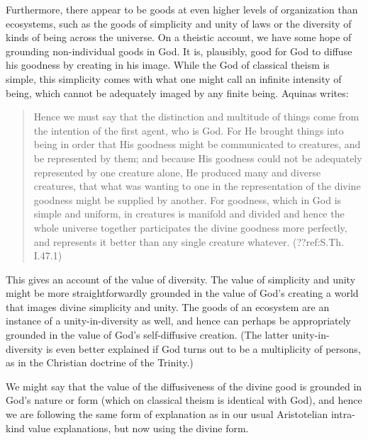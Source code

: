 Furthermore, there appear to be goods at even higher levels of organization than ecosystems, such as the goods
of simplicity and unity of 
laws or the diversity of kinds of being across the universe. On a theistic account, we have some hope of grounding
non-individual goods in God. It is, plausibly, good for God to diffuse his goodness
by creating in his image. While the God of classical theism is simple, this simplicity comes with what
one might call an infinite intensity of being, which cannot be adequately imaged by any finite being. Aquinas
writes:
\begin{quote}
Hence we must say that the distinction and multitude of things come from the intention of the first agent, who is God. For He brought things into being in order that His goodness might be communicated to creatures, and be represented by them; and because His goodness could not be adequately represented by one creature alone, He produced many and diverse creatures, that what was wanting to one in the representation of the divine goodness might be supplied by another. For goodness, which in God is simple and uniform, in creatures is manifold and divided and hence the whole universe together participates the divine goodness more perfectly, and represents it better than any single creature whatever. (??ref:S.Th. I.47.1)
\end{quote}
This gives an account of the value of diversity. The value of simplicity and unity might be more straightforwardly
grounded in the value of God's creating a world that images divine simplicity and unity. The goods of an ecosystem
are an instance of a unity-in-diversity as well, and hence can perhaps be appropriately grounded in the value of God's
self-diffusive creation. (The latter unity-in-diversity is even better explained if God turns out to be a multiplicity
of persons, as in the Christian doctrine of the Trinity.)

We might say that the value of the diffusiveness of the divine good is grounded in God's nature or form (which
on classical theism is identical with God), and hence we are following the same form of explanation as in our usual Aristotelian
intra-kind value explanations, but now using the divine form.

